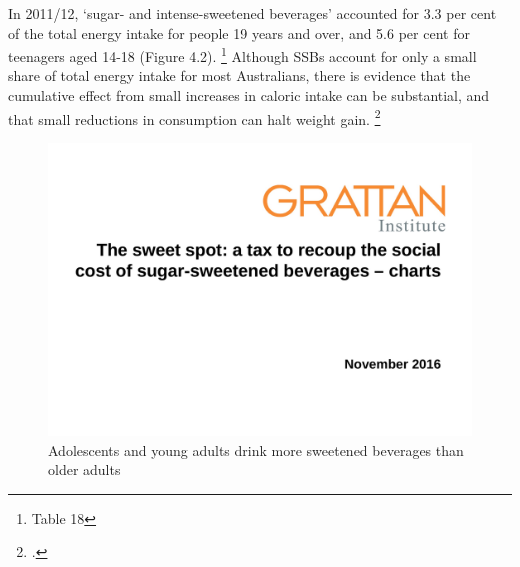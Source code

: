 \documentclass[embargoed]{grattan}
\begin{document}
In 2011/12, `sugar- and intense-sweetened beverages' accounted for 3.3 per cent of the total energy intake for people 19 years and over, and 5.6 per cent for teenagers aged 14-18 (Figure 4.2).%
\footnote{\textcite{ABS20144364055007AustralianHealth} Table 18} Although SSBs account for only a small share of total energy intake for most Australians, there is evidence that the cumulative effect from small increases in caloric intake can be substantial, and that small reductions in consumption can halt weight gain.%
\footcites{Fletcher2011Aresoftdrink}{Cutler2003WhyhaveAmericans}

\begin{figure}
\caption{Adolescents and young adults drink more sweetened beverages than older adults}

\includegraphics[page=9]{atlas/ObesityCharts}


\end{figure}
\end{document}
